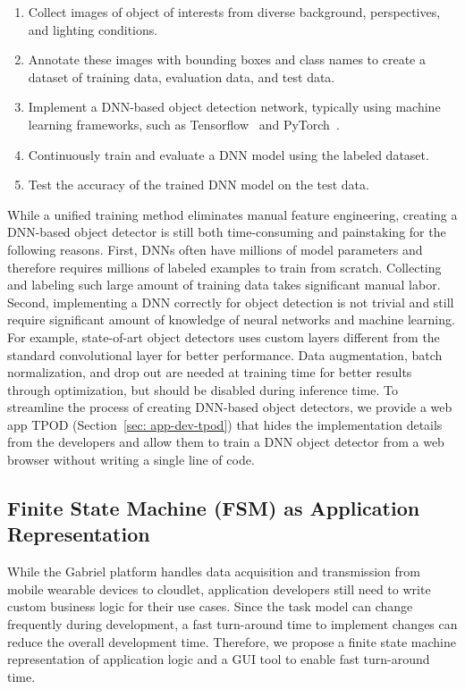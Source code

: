 \begin{enumerate}
  \item Collect images of object of interests from diverse background,
  perspectives, and lighting conditions.
  \item Annotate these images with bounding boxes and class names to create a
  dataset of training data, evaluation data, and test data.
  \item Implement a DNN-based object detection network, typically using machine learning frameworks,
  such as Tensorflow~\cite{abadi2016tensorflow} and
  PyTorch~\cite{paszke2019pytorch}.
  \item Continuously train and evaluate a DNN model using the labeled dataset.
  \item Test the accuracy of the trained DNN model on the test data.
\end{enumerate}

While a unified training method eliminates manual feature engineering, creating
a DNN-based object detector is still both time-consuming and painstaking for the
following reasons. First, DNNs often have millions of model parameters and
therefore requires millions of labeled examples to train from scratch.
Collecting and labeling such large amount of training data takes significant
manual labor. Second, implementing a DNN correctly for object detection is not
trivial and still require significant amount of knowledge of neural networks and
machine learning. For example, state-of-art object detectors uses custom layers
different from the standard convolutional layer for better performance. Data
augmentation, batch normalization, and drop out are needed at training time for
better results through optimization, but should be disabled during inference
time. To streamline the process of creating DNN-based object detectors, we
provide a web app TPOD (Section~\ref{sec: app-dev-tpod}) that hides the
implementation details from the developers and allow them to train a DNN object
detector from a web browser without writing a single line of code.

\subsection{Finite State Machine (FSM) as Application Representation}
\label{sec: app-dev-fsm-representation}

While the Gabriel platform handles data acquisition and transmission from mobile
wearable devices to cloudlet, application developers still need to write custom
business logic for their use cases. Since the task model can change frequently
during development, a fast turn-around time to implement changes can reduce the
overall development time. Therefore, we propose a finite state machine
representation of application logic and a GUI tool to enable fast turn-around
time. 

